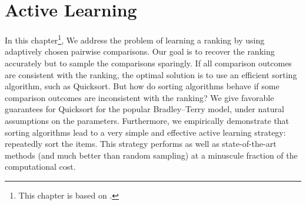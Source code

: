 \chapter{Active Learning}
\label{ch:robustsort}

In this chapter\footnote{%
This chapter is based on \citet{maystre2017just}.},
We address the problem of learning a ranking by using adaptively chosen pairwise comparisons.
Our goal is to recover the ranking accurately but to sample the comparisons sparingly.
If all comparison outcomes are consistent with the ranking, the optimal solution is to use an efficient sorting algorithm, such as Quicksort.
But how do sorting algorithms behave if some comparison outcomes are inconsistent with the ranking?
We give favorable guarantees for Quicksort for the popular Bradley--Terry model, under natural assumptions on the parameters.
Furthermore, we empirically demonstrate that sorting algorithms lead to a very simple and effective active learning strategy: repeatedly sort the items.
This strategy performs as well as state-of-the-art methods (and much better than random sampling) at a minuscule fraction of the computational cost.







